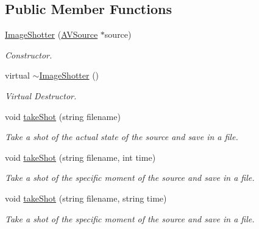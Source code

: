 \subsection*{Public Member Functions}
\begin{DoxyCompactItemize}
\item 
\hyperlink{classbr_1_1ufscar_1_1lince_1_1streaming_1_1ImageShotter_a83721159b935035fefd943dd07ce9c45}{ImageShotter} (\hyperlink{classbr_1_1ufscar_1_1lince_1_1streaming_1_1AVSource}{AVSource} $\ast$source)
\begin{DoxyCompactList}\small\item\em Constructor. \item\end{DoxyCompactList}\item 
virtual \hyperlink{classbr_1_1ufscar_1_1lince_1_1streaming_1_1ImageShotter_a8e7533601e7d8aeb66e604e6b45a76ed}{$\sim$ImageShotter} ()
\begin{DoxyCompactList}\small\item\em Virtual Destructor. \item\end{DoxyCompactList}\item 
void \hyperlink{classbr_1_1ufscar_1_1lince_1_1streaming_1_1ImageShotter_a7a1938df6d0b9b4f5930347b821dd17f}{takeShot} (string filename)
\begin{DoxyCompactList}\small\item\em Take a shot of the actual state of the source and save in a file. \item\end{DoxyCompactList}\item 
void \hyperlink{classbr_1_1ufscar_1_1lince_1_1streaming_1_1ImageShotter_a854a62146dd7af6bfe5c547be019e92b}{takeShot} (string filename, int time)
\begin{DoxyCompactList}\small\item\em Take a shot of the specific moment of the source and save in a file. \item\end{DoxyCompactList}\item 
void \hyperlink{classbr_1_1ufscar_1_1lince_1_1streaming_1_1ImageShotter_a793acdf0bc839712847085535780a900}{takeShot} (string filename, string time)
\begin{DoxyCompactList}\small\item\em Take a shot of the specific moment of the source and save in a file. \item\end{DoxyCompactList}\item 

\end{DoxyCompactItemize}
